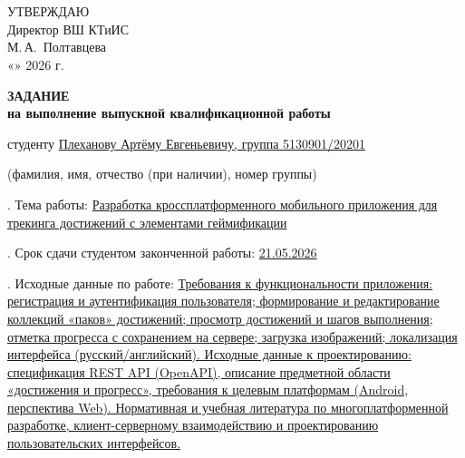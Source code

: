 
\thispagestyle{empty} %

\begin{center}
	\workMinistry \\
	\workUniversity \\
	\workInstitute
\end{center}

\vspace{2ex}

\hfill\begin{minipage}{7.5cm}
	УТВЕРЖДАЮ\\[1ex]
	Директор ВШ КТиИС\\[1ex]
	\underline{\hspace{3cm}} М.\,А.~Полтавцева\\[1ex]
	«\underline{\hspace{1cm}}»\underline{\hspace{3cm}} 2026 г.
\end{minipage}

\vspace{4ex}

\begin{center}
	\textbf{ЗАДАНИЕ}\\
	\textbf{на выполнение выпускной квалификационной работы}
\end{center}

\vspace{2ex}

\noindent
студенту \uline{Плеханову Артёму Евгеньевичу, группа 5130901/20201} \\
\centerline{\scriptsize (фамилия, имя, отчество (при наличии), номер группы)}

\vspace{2ex}

. Тема работы: \uline{Разработка кроссплатформенного мобильного приложения для трекинга достижений с элементами геймификации}

\vspace{1ex}

. Срок сдачи студентом законченной работы: \uline{21.05.2026}

\vspace{1ex}

. Исходные данные по работе: \uline{Требования к функциональности приложения: регистрация и аутентификация пользователя; формирование и редактирование коллекций «паков» достижений; просмотр достижений и шагов выполнения; отметка прогресса с сохранением на сервере; загрузка изображений; локализация интерфейса (русский/английский). Исходные данные к проектированию: спецификация REST API (OpenAPI), описание предметной области «достижения и прогресс», требования к целевым платформам (Android, перспектива Web). Нормативная и учебная литература по многоплатформенной разработке, клиент-серверному взаимодействию и проектированию пользовательских интерфейсов.}

